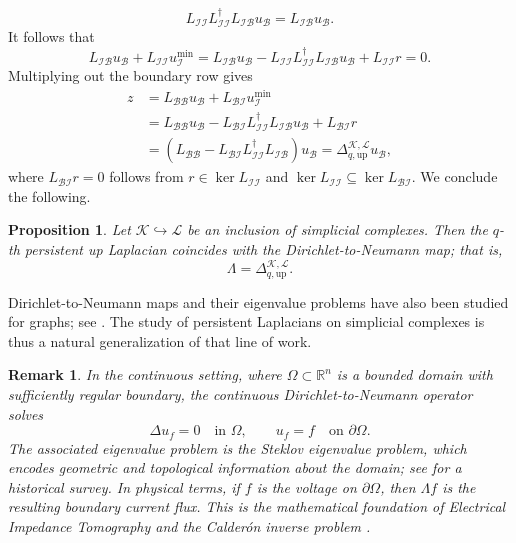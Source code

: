 \documentclass{article}
\newtheorem{proposition}{Proposition}[section]
\newtheorem{remark}{Remark}[section]
\newcommand{\KK}{\mathcal{K}}
\newcommand{\LL}{\mathcal{L}}
\begin{document}
\[
L_{\mathcal I\mathcal I}L_{\mathcal I\mathcal I}^{\dagger}L_{\mathcal I\mathcal B}u_{\mathcal B}=L_{\mathcal I\mathcal B}u_{\mathcal B}.
\]
It follows that
\[
L_{\mathcal I\mathcal B}u_{\mathcal B}+L_{\mathcal I\mathcal I}u_{\mathcal I}^{\min}
=
L_{\mathcal I\mathcal B}u_{\mathcal B}-L_{\mathcal I\mathcal I}L_{\mathcal I\mathcal I}^{\dagger}L_{\mathcal I\mathcal B}u_{\mathcal B}+L_{\mathcal I\mathcal I}r=0.
\]
Multiplying out the boundary row gives
\[
\begin{aligned}
z&=L_{\mathcal B\mathcal B}u_{\mathcal B}+L_{\mathcal B\mathcal I}u_{\mathcal I}^{\min}\\
&=L_{\mathcal B\mathcal B}u_{\mathcal B}-L_{\mathcal B\mathcal I}L_{\mathcal I\mathcal I}^{\dagger}L_{\mathcal I\mathcal B}u_{\mathcal B}+L_{\mathcal B\mathcal I}r\\
&=\left(L_{\mathcal B\mathcal B}-L_{\mathcal B\mathcal I}L_{\mathcal I\mathcal I}^{\dagger}L_{\mathcal I\mathcal B}\right)u_{\mathcal B}
=\Delta_{q,\mathrm{up}}^{\KK,\LL}u_{\mathcal B},
\end{aligned}
\]
where $L_{\mathcal B\mathcal I}r=0$ follows from $r\in\ker L_{\mathcal I\mathcal I}$ and $\ker L_{\mathcal I\mathcal I}\subseteq\ker L_{\mathcal B\mathcal I}$. We conclude the following.

\begin{proposition}
Let $\KK\hookrightarrow\LL$ be an inclusion of simplicial complexes. Then the $q$-th persistent up Laplacian coincides with the Dirichlet-to-Neumann map; that is,
\[
\Lambda=\Delta_{q,\mathrm{up}}^{\KK,\LL}.
\]
\end{proposition}

Dirichlet-to-Neumann maps and their eigenvalue problems have also been studied for graphs; see \cite{MR3722072,MR4445686}. The study of persistent Laplacians on simplicial complexes is thus a natural generalization of that line of work.

\begin{remark}
In the continuous setting, where $\Omega\subset\mathbb{R}^n$ is a bounded domain with sufficiently regular boundary, the continuous Dirichlet-to-Neumann operator \cite{MR3616276} solves
\[
\Delta u_f=0\quad \text{in }\Omega,\qquad u_f=f\quad \text{on }\partial\Omega.
\]The associated eigenvalue problem is the \emph{Steklov eigenvalue problem}, which encodes geometric and topological information about the domain; see \cite{MR3137253} for a historical survey. In physical terms, if $f$ is the voltage on $\partial\Omega$, then $\Lambda f$ is the resulting boundary current flux. This is the mathematical foundation of \emph{Electrical Impedance Tomography} and the \emph{Calderón inverse problem} \cite{MR590275,MR3460047}. 
\end{remark}
\end{document}
